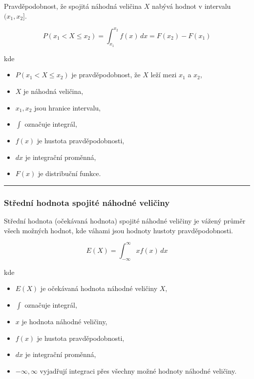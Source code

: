 \documentclass[a4paper, 11pt]{article}
\begin{document}
Pravděpodobnost, že spojitá náhodná veličina $X$ nabývá hodnot
v intervalu $(x_1, x_2]$.

\begin{equation*}
	P(x_1 < X \le x_2)
	=
	\int_{x_1}^{x_2} f(x)\,dx
	=
	F(x_2) - F(x_1)
\end{equation*}

kde

\begin{itemize}[noitemsep]
	\item $P(x_1 < X \le x_2)$ je pravděpodobnost, že $X$ leží mezi $x_1$ a $x_2$,
	\item $X$ je náhodná veličina,
	\item $x_1, x_2$ jsou hranice intervalu,
	\item $\int$ označuje integrál,
	\item $f(x)$ je hustota pravděpodobnosti,
	\item $dx$ je integrační proměnná,
	\item $F(x)$ je distribuční funkce.
\end{itemize}

\noindent\hrule\medskip

\subsubsection{Střední hodnota spojité náhodné veličiny}

Střední hodnota (očekávaná hodnota) spojité náhodné veličiny
je vážený průměr všech možných hodnot, kde váhami jsou
hodnoty hustoty pravděpodobnosti.

\begin{equation*}
	E(X) = \int_{-\infty}^{\infty} x f(x)\,dx
\end{equation*}

kde

\begin{itemize}[noitemsep]
	\item $E(X)$ je očekávaná hodnota náhodné veličiny $X$,
	\item $\int$ označuje integrál,
	\item $x$ je hodnota náhodné veličiny,
	\item $f(x)$ je hustota pravděpodobnosti,
	\item $dx$ je integrační proměnná,
	\item $-\infty, \infty$ vyjadřují integraci přes všechny možné hodnoty
	      náhodné veličiny.
\end{itemize}
\end{document}
